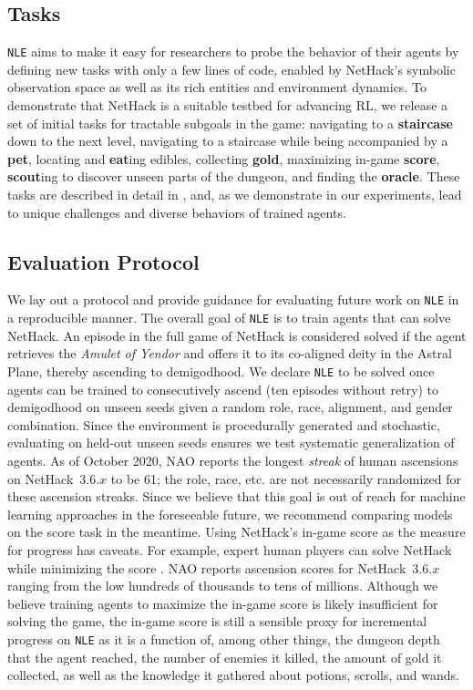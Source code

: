 \documentclass{article}
\newcommand{\nethack}{NetHack}
\newcommand{\NLE}{\texttt{NLE}}
\begin{document}
\subsection{Tasks}
\label{sec:tasks}

\NLE{} aims to make it easy for researchers to probe the
behavior of their agents by defining new tasks with only a few lines
of code, enabled by \nethack{}'s symbolic observation space as well as
its rich entities and environment dynamics. To demonstrate that
\nethack{} is a suitable testbed for advancing RL, we release a set of
initial tasks for tractable subgoals in the game: navigating to a \textbf{staircase} down to the next level, navigating to a staircase while being accompanied by a \textbf{pet}, locating and \textbf{eat}ing edibles, collecting \textbf{gold}, maximizing in-game \textbf{score}, \textbf{scout}ing to discover unseen parts of the dungeon, and finding the \textbf{oracle}. These tasks are described in detail in , and, as we demonstrate in our experiments, lead to unique challenges and diverse behaviors of trained agents.

\subsection{Evaluation Protocol}
\label{sec:eval}
We lay out a protocol and provide guidance for evaluating future work on \NLE{} in a reproducible manner.
The overall goal of \NLE{} is to train agents that can solve \nethack{}.
An episode in the full game of \nethack{} is considered solved if the agent retrieves the \emph{Amulet of Yendor} and offers it to its co-aligned deity in the Astral Plane, thereby ascending to demigodhood.
We declare \NLE{} to be solved once agents can be trained to consecutively ascend (ten episodes without retry) to demigodhood on unseen seeds given a random role, race, alignment, and gender combination.
Since the environment is procedurally generated and stochastic, evaluating on held-out unseen seeds ensures we test systematic generalization of agents.
As of October 2020, NAO reports the longest \textit{streak} of human ascensions on NetHack~3.6.$x$ to be 61; the role, race, etc. are not necessarily randomized for these ascension streaks.
Since we believe that this goal is out of reach for machine learning approaches in the foreseeable future, we recommend comparing models on the score task in the meantime.
Using \nethack{}'s in-game score as the measure for progress has caveats.
For example, expert human players can solve \nethack{} while minimizing the score \citep[see][``Score'' entry, for details]{nhwiki}. NAO reports ascension scores for \nethack~3.6.$x$ ranging from the low hundreds of thousands to tens of millions.
Although we believe training agents to maximize the in-game score is likely insufficient for solving the game, the in-game score is still a sensible proxy for incremental progress on \NLE{} as it is a function of, among other things, the dungeon depth that the agent reached, the number of  enemies it killed, the amount of gold it collected, as well as the knowledge it gathered about potions, scrolls, and wands.
\end{document}
